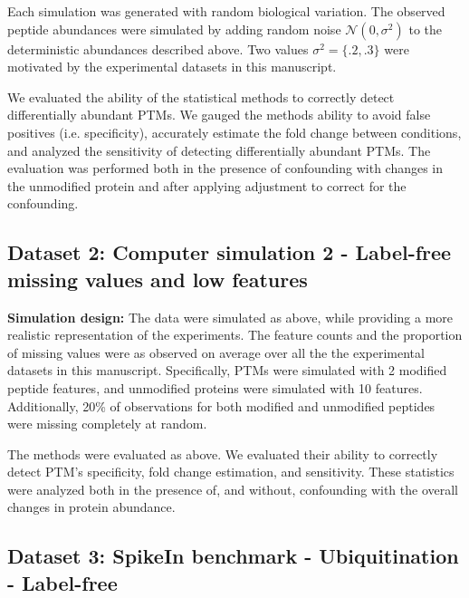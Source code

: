 \documentclass[mcp]{article}
\numberwithin{table}{section}
\begin{document}
Each simulation was generated with random biological variation. The observed peptide abundances were simulated by adding random noise $\mathcal{N}(0,\sigma^2)$ to the deterministic abundances described above. Two values $\sigma^2 = \{.2, .3\}$ were motivated by the experimental datasets in this manuscript.

\medskip {} We evaluated the ability of the statistical methods to correctly detect differentially abundant PTMs. We gauged the methods ability to avoid false positives (i.e. specificity), accurately estimate the fold change between conditions, and analyzed the sensitivity of detecting differentially abundant PTMs. The evaluation was performed both in the presence of confounding with changes in the unmodified protein and after applying adjustment to correct for the confounding.

\subsection*{Dataset 2: Computer simulation 2 - Label-free missing values and low features}
\label{sec:comp_sim_procedure2}

{\bf Simulation design:} The data were simulated as above, while providing a more realistic representation of the experiments. The feature counts and the proportion of missing values were as observed on average over all the the experimental datasets in this manuscript. Specifically, PTMs were simulated with 2 modified peptide features, and unmodified proteins were simulated with 10 features. Additionally, 20\% of observations for both modified and unmodified peptides were missing completely at random.

\medskip {} The methods were evaluated as above. We evaluated their ability to correctly detect PTM's specificity, fold change estimation, and sensitivity. These statistics were analyzed both in the presence of, and without, confounding with the overall changes in protein abundance.
 
\subsection*{Dataset 3: SpikeIn benchmark - Ubiquitination - Label-free}
\label{sec:exp_proc_dataset3}
\end{document}
